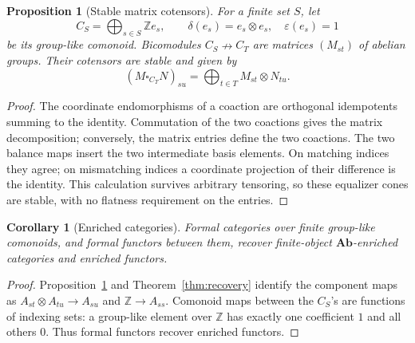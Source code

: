 \documentclass[11pt,a4paper]{article}
\newtheorem{proposition}[theorem]{Proposition}
\newtheorem{corollary}[theorem]{Corollary}
\theoremstyle{definition}
\theoremstyle{remark}
\numberwithin{equation}{section}
\newcommand{\Z}{\mathbb Z}
\newcommand{\Ab}{\mathbf{Ab}}
\newcommand{\harr}{\mathrel{\nrightarrow}}
\newcommand{\eps}{\varepsilon}
\begin{document}
\begin{proposition}[Stable matrix cotensors]\label{prop:matrix}
For a finite set $S$, let
\[
C_S=\bigoplus_{s\in S}\Z e_s,\qquad
\delta(e_s)=e_s\otimes e_s,\quad\eps(e_s)=1
\]
be its group-like comonoid. Bicomodules $C_S\harr C_T$ are matrices
$(M_{st})$ of abelian groups. Their cotensors are stable and given by
\begin{equation}\label{eq:matrix}
(M\square_{C_T}N)_{su}
=\bigoplus_{t\in T}M_{st}\otimes N_{tu}.
\end{equation}
\end{proposition}
\begin{proof}
The coordinate endomorphisms of a coaction are orthogonal idempotents
summing to the identity. Commutation of the two coactions gives the
matrix decomposition; conversely, the matrix entries define the two
coactions. The two balance maps insert the two intermediate basis elements.
On matching indices they agree; on mismatching indices a coordinate
projection of their difference is the identity. This calculation survives
arbitrary tensoring, so these equalizer cones are stable, with no
flatness requirement on the entries.
\end{proof}

\begin{corollary}[Enriched categories]\label{cor:enriched-categories}
Formal categories over finite group-like comonoids, and formal functors
between them, recover finite-object $\Ab$-enriched categories and
enriched functors.
\end{corollary}
\begin{proof}
Proposition~\ref{prop:matrix} and Theorem~\ref{thm:recovery} identify the
component maps as $A_{st}\otimes A_{tu}\to A_{su}$ and
$\Z\to A_{ss}$. Comonoid maps between the $C_S$'s are functions of
indexing sets: a group-like element over $\Z$ has exactly one coefficient
$1$ and all others $0$. Thus formal functors recover enriched functors.
\end{proof}
\end{document}
